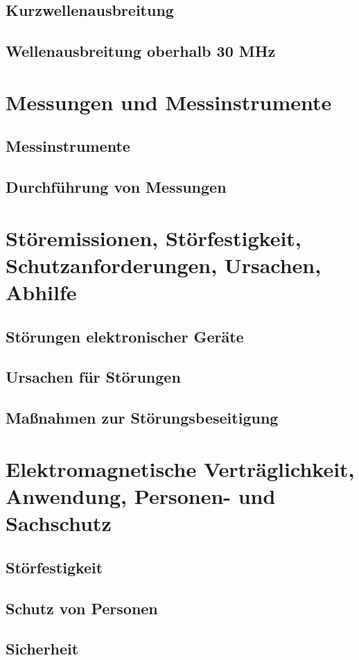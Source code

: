 \documentclass[
  ngerman,
  paper=a4,
  10pt,
  headings=small,
  DIV=15,
]{scrartcl}
\begin{document}
  \subsection{Kurzwellenausbreitung}
  \subsection{Wellenausbreitung oberhalb 30 MHz}
  
  \section{Messungen und Messinstrumente}
  \subsection{Messinstrumente}
  \subsection{Durchführung von Messungen}
  
  \section{Störemissionen, Störfestigkeit, Schutzanforderungen, Ursachen, Abhilfe}
  \subsection{Störungen elektronischer Geräte}
  \subsection{Ursachen für Störungen}
  \subsection{Maßnahmen zur Störungsbeseitigung}
  
  \section{Elektromagnetische Verträglichkeit, Anwendung, Personen- und Sachschutz}
  \subsection{Störfestigkeit}
  \subsection{Schutz von Personen}
  \subsection{Sicherheit}
\end{document}
